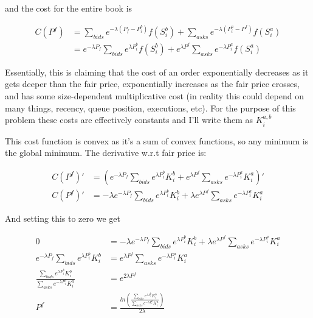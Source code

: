 \documentclass[]{article}
\begin{document}
	and the cost for the entire book is
	
	\begin{equation}
		\begin{split}
			C(P^f) &= \sum_{bids} e^{-\lambda (P_f - P^b_i )} f(S^b_i) + \sum_{asks} e^{-\lambda (P^a_i - P^f )} f(S^a_i) \\
			&= e^{-\lambda P_f}\sum_{bids}  e^{\lambda P^b_i} f(S^b_i) +e^{\lambda P^f }  \sum_{asks}  e^{-\lambda P^a_i} f(S^a_i)
		\end{split}
	\end{equation}
	
	Essentially, this is claiming that the cost of an order exponentially decreases as it gets deeper than the fair price, exponentially increases as the fair price crosses, and has some size-dependent multiplicative cost (in reality this could depend on many things, recency, queue position, executions, etc). For the purpose of this problem these costs are effectively constants and I'll write them as $K^{a,b}_i$
	
	This cost function is convex as it's a sum of convex functions, so any minimum is the global minimum. The derivative w.r.t fair price is:
	
	\begin{equation}
		\begin{split}
			C(P^f)' &= (e^{-\lambda P_f}\sum_{bids}  e^{\lambda P^b_i} K^b_i +e^{\lambda P^f }  \sum_{asks}  e^{-\lambda P^a_i} K^a_i)' \\
			C(P^f)' &= -\lambda e^{-\lambda P_f}\sum_{bids}  e^{\lambda P^b_i} K^b_i + \lambda e^{\lambda P^f }  \sum_{asks}  e^{-\lambda P^a_i} K^a_i
		\end{split}
	\end{equation}
	
	And setting this to zero we get
	
	\begin{equation}
		\begin{split}
			0 &= -\lambda e^{-\lambda P_f}\sum_{bids}  e^{\lambda P^b_i} K^b_i + \lambda e^{\lambda P^f }  \sum_{asks}  e^{-\lambda P^a_i} K^a_i \\
			e^{-\lambda P_f}\sum_{bids}  e^{\lambda P^b_i} K^b_i &=  e^{\lambda P^f }  \sum_{asks}  e^{-\lambda P^a_i} K^a_i \\
			\frac{\sum_{bids}  e^{\lambda P^b_i} K^b_i}{\sum_{asks}  e^{-\lambda P^a_i} K^a_i} &=  e^{2\lambda P^f } \\
			P^f &=	\frac{ln(\frac{\sum_{bids}  e^{\lambda P^b_i} K^b_i}{\sum_{asks}  e^{-\lambda P^a_i} K^a_i})}{2\lambda} \\
		\end{split}
	\end{equation}
	
\end{document}
